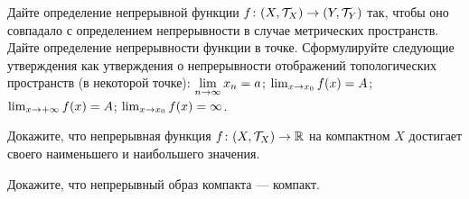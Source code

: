 \documentclass[a4paper,10pt]{article}
\begin{document}
    Дайте определение  непрерывной функции $f\colon (X,\mathcal{T}_X)\rightarrow (Y,\mathcal{T}_Y)$ так, чтобы оно совпадало с определением непрерывности в случае метрических пространств.\\
    Дайте определение непрерывности функции в точке.
    Сформулируйте следующие утверждения как утверждения о непрерывности отображений топологических пространств (в некоторой точке):
    $\lim\limits_{n \rightarrow \infty} x_n = a$; $\lim_{x\rightarrow x_0} f(x) = A$; $\lim_{x\rightarrow +\infty} f(x) = A$;  $\lim_{x\rightarrow x_0} f(x) = \infty$.


    Докажите, что непрерывная функция $f\colon(X,\mathcal{T}_X)\rightarrow\mathbb{R}$ на компактном $X$ достигает своего наименьшего и наибольшего значения.

    Докажите, что непрерывный образ компакта --- компакт.


\end{document}
